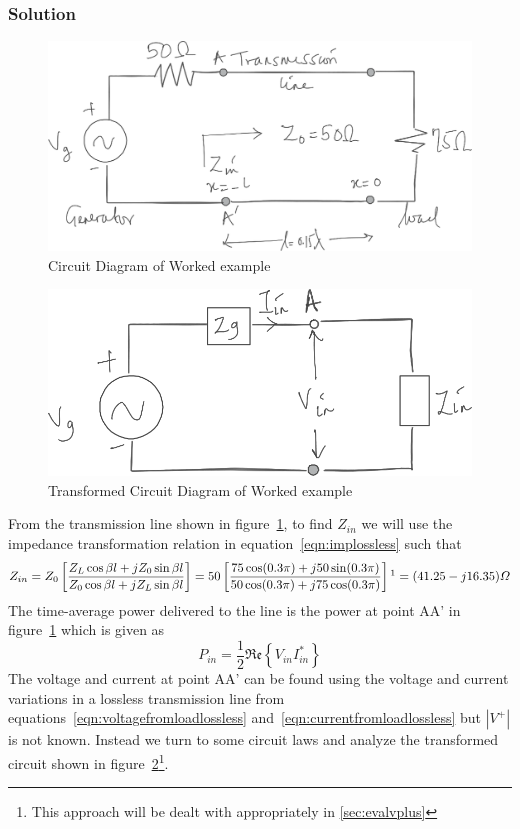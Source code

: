 \begin{exmp}
\subsubsection*{Solution}
\begin{figure}[h]
\centering
\includegraphics[width=1\linewidth]{./graphics/power_problem_temp}
\caption{Circuit Diagram of Worked example}
\label{fig:powerproblem}
\end{figure}
\begin{figure}[h]
\centering
\includegraphics[width=.7\linewidth]{./graphics/power_problem2_temp}
\caption{Transformed Circuit Diagram of Worked example}
\label{fig:powerproblem2}
\end{figure}

From the transmission line shown in figure~\ref{fig:powerproblem}, to find $Z_{in}$ we will use the impedance transformation relation in equation~\eqref{eqn:implossless} such that
\begin{dmath*}
Z_{in} = Z_0\left[\frac{Z_L\cos\beta l + jZ_0\sin\beta l}{Z_0\cos\beta l + jZ_L\sin\beta l} \right]
= 50\left[\frac{75\cos(0.3\pi) + j50\sin(0.3\pi)}{50\cos(0.3\pi) + j75\cos(0.3\pi)} \right]\footnotemark
= (41.25 - j16.35)\varOmega
\end{dmath*}
The time-average power delivered to the line is the power at point AA' in figure~\ref{fig:powerproblem} which is given as
\begin{dmath*}
P_{in} = \frac{1}{2}\mathfrak{Re}\left\lbrace V_{in}I_{in}^*\right\rbrace
\end{dmath*}
The voltage and current at point AA' can be found using the voltage and current variations in a lossless transmission line from equations~\eqref{eqn:voltagefromloadlossless} and~\eqref{eqn:currentfromloadlossless} but $|V^+|$ is not known. Instead we turn to some circuit laws and analyze the transformed circuit shown in figure~\ref{fig:powerproblem2}\footnote{This approach will be dealt with appropriately in \autoref{sec:evalvplus}}.


\end{exmp}
